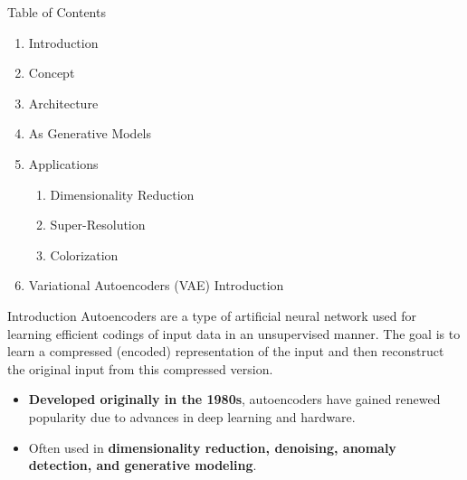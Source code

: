 \begin{frame}[allowframebreaks]{Table of Contents}
\begin{enumerate}
    \item Introduction
    \item Concept
    \item Architecture
    \item As Generative Models
    \item Applications
        \begin{enumerate}
            \item Dimensionality Reduction
            \item Super-Resolution
            \item Colorization
        \end{enumerate}
    \item Variational Autoencoders (VAE) Introduction
\end{enumerate}
\end{frame}


\begin{frame}{Introduction}
    Autoencoders are a type of artificial neural network used for learning efficient codings of input data in an unsupervised manner. The goal is to learn a compressed (encoded) representation of the input and then reconstruct the original input from this compressed version.
    \begin{itemize}
        \item \textbf{Developed originally in the 1980s}, autoencoders have gained renewed popularity due to advances in deep learning and hardware.
        \item Often used in \textbf{dimensionality reduction, denoising, anomaly detection, and generative modeling}.
    \end{itemize}
\end{frame}